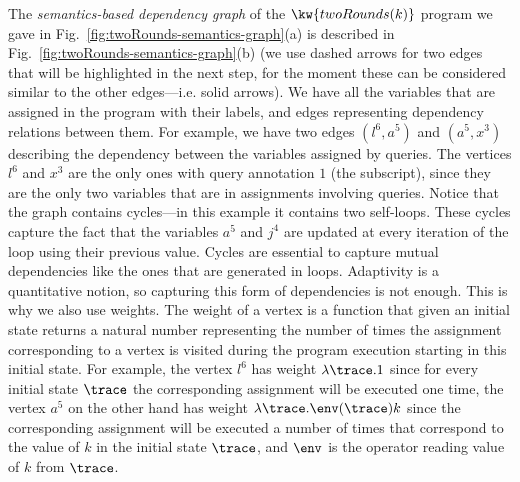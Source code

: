 \begin{example}
The \emph{semantics-based dependency graph} of the $\kw{twoRounds(k)}$ program
we gave in Fig.~\ref{fig:twoRounds-semantics-graph}(a) is described in Fig.~\ref{fig:twoRounds-semantics-graph}(b) (we use dashed arrows for two edges that will be highlighted in the next step, for the moment these can be considered similar to the other edges---i.e. solid arrows). We have all the variables that are assigned in the program with their labels, and edges representing dependency relations between them. 
For example, we have two edges $(l^6, a^5)$ and $(a^5, x^3)$ describing the dependency between the variables assigned by queries. The vertices $l^6$ and $x^3$ are the only ones with query annotation $1$ (the subscript), since they are the only two variables that are in assignments involving  queries. Notice that the graph contains cycles---in this example it contains two self-loops. These cycles capture the fact that the variables $a^5$ and $j^4$ are updated at every iteration of the loop using their previous value. Cycles are essential to capture mutual dependencies like the ones that are generated in loops. Adaptivity is a quantitative notion, so capturing this form of dependencies is not enough. This is why we also use weights. The weight of a vertex is a function that given an initial state returns a natural number representing 
the number of times the assignment corresponding to a vertex is visited during the program execution starting in this initial state.  
For example, the vertex $l^{6}$ has weight {$\lambda \trace.1$} since for every initial state {$\trace$} the corresponding assignment will be executed one time, the vertex $a^5$ on the other hand has weight $\lambda \trace. \env(\trace) k$ since the corresponding assignment will be executed a number of times that correspond to the value of $k$ in the initial state $\trace$, and $\env$ is the operator reading value of $k$ from $\trace$.


\end{example}
